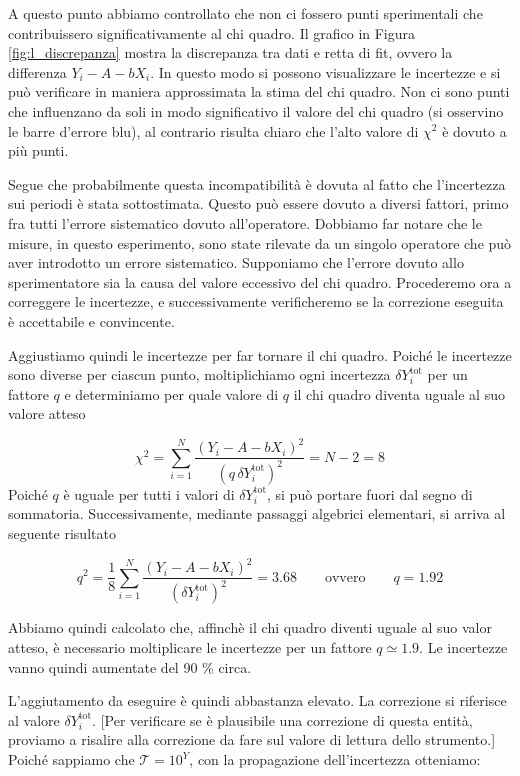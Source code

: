 A questo punto abbiamo controllato che non ci fossero punti sperimentali che contribuissero significativamente
al chi quadro. Il grafico in Figura \ref{fig:l_discrepanza} mostra la discrepanza tra dati e retta di fit,
ovvero la differenza $Y_i - A - bX_i$. In questo modo si possono visualizzare le incertezze e si può verificare
in maniera approssimata la stima del chi quadro. Non ci sono punti che influenzano da soli in modo significativo
il valore del chi quadro (si osservino le barre d'errore blu), al contrario risulta chiaro che l'alto valore di $\chi^2$
è dovuto a più punti.

Segue che probabilmente questa incompatibilità è dovuta al fatto che l'incertezza sui periodi è stata sottostimata.
Questo può essere dovuto a diversi fattori, primo fra tutti l'errore sistematico dovuto all'operatore. Dobbiamo
far notare che le misure, in questo esperimento, sono state rilevate da un singolo operatore che può aver introdotto
un errore sistematico. Supponiamo che
l'errore dovuto allo sperimentatore sia la causa del valore eccessivo del chi quadro. Procederemo ora a correggere le incertezze,
e successivamente verificheremo se la correzione eseguita è accettabile e convincente.

Aggiustiamo quindi le incertezze per far tornare il chi quadro.  Poiché le incertezze sono diverse per ciascun punto,
moltiplichiamo ogni incertezza $\delta Y_i^{\text{tot}}$ per un fattore $q$ e determiniamo per quale valore di $q$
il chi quadro diventa uguale al suo valore atteso

\begin{equation}
    \chi^2 = \sum_{i=1}^N \frac{(Y_i - A - bX_i)^2}{(q\, \delta Y_i^{\text{tot}})^2} = N - 2 = 8
\end{equation}
%
Poiché $q$ è uguale per tutti i valori di $\delta Y_i^{\text{tot}}$, si può portare fuori dal segno di sommatoria.
Successivamente, mediante passaggi algebrici elementari, si arriva al seguente risultato

\begin{equation}
    q^2 = \frac{1}{8} \sum_{i=1}^N \frac{(Y_i - A - bX_i)^2}{(\delta Y_i^{\text{tot}})^2} = 3.68 \qquad \text{ovvero} \qquad q = 1.92
\end{equation}

Abbiamo quindi calcolato che, affinchè il chi quadro diventi uguale al suo valor atteso, è necessario moltiplicare
le incertezze per un fattore $q \simeq 1.9$. Le incertezze vanno quindi aumentate del 90 \% circa.

L'aggiutamento da eseguire è quindi abbastanza elevato. La correzione si riferisce al valore $\delta Y_i^{\text{tot}}$.
[Per verificare se è plausibile una correzione di questa entità, proviamo a risalire alla correzione da fare sul valore di lettura
dello strumento.]
Poiché sappiamo che $\mathcal{T} = 10^Y$, con la propagazione dell'incertezza otteniamo:

